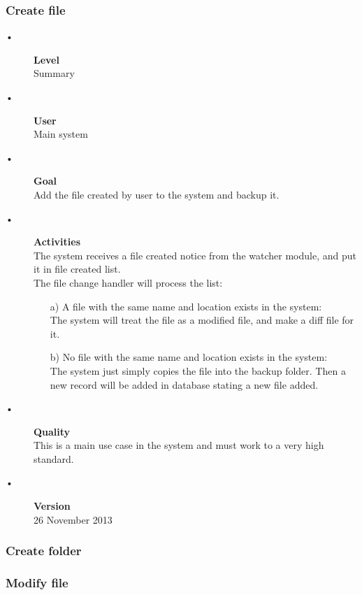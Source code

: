\documentclass[12pt,a4paper]{article}
\begin{document}
\subsubsection{Create file} 
\begin{description}
	\item[•] \textbf{Level}  \hfill \\
	Summary
	\item[•] \textbf{User} \hfill \\
	Main system
	\item[•] \textbf{Goal} \hfill \\
	Add the file created by user to the system and backup it.
	\item[•] \textbf{Activities} \hfill \\
	The system receives a file created notice from the watcher module, and put it in file created list.\\
	The file change handler will process the list:
	\begin{enumerate}
		\item[a)]A file with the same name and location exists in the system: 
		\hfill \\
		The system will treat the file as a modified file, and make a diff  file for it.

		\item[b)]No file with the same name and location exists in the system: 
		\hfill \\
		The system just simply copies the file into the backup folder. Then a new record will be added in database stating a new file added.
	\end{enumerate}
	\item[•] \textbf{Quality} \hfill \\
	This is a main use case in the system and must work to a very high standard.
	\item[•] \textbf{Version} \hfill \\
	26 November 2013	
\end{description}
\subsubsection{Create folder} 	
\subsubsection{Modify file} 
\end{document}
